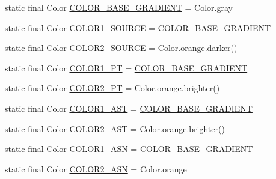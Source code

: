 \begin{DoxyCompactItemize}
\item 
static final Color \hyperlink{classit_1_1emarolab_1_1cagg_1_1debugging_1_1DebuggingDefaults_a17491ab8ed655381e8f8cc34e9d3b670}{C\-O\-L\-O\-R\-\_\-\-B\-A\-S\-E\-\_\-\-G\-R\-A\-D\-I\-E\-N\-T} = Color.\-gray
\item 
static final Color \hyperlink{classit_1_1emarolab_1_1cagg_1_1debugging_1_1DebuggingDefaults_a1ca8258073b237027e0c9b3499c239cf}{C\-O\-L\-O\-R1\-\_\-\-S\-O\-U\-R\-C\-E} = \hyperlink{classit_1_1emarolab_1_1cagg_1_1debugging_1_1DebuggingDefaults_a17491ab8ed655381e8f8cc34e9d3b670}{C\-O\-L\-O\-R\-\_\-\-B\-A\-S\-E\-\_\-\-G\-R\-A\-D\-I\-E\-N\-T}
\item 
static final Color \hyperlink{classit_1_1emarolab_1_1cagg_1_1debugging_1_1DebuggingDefaults_ad8a29b271e97836a8d707dd93f0fb553}{C\-O\-L\-O\-R2\-\_\-\-S\-O\-U\-R\-C\-E} = Color.\-orange.\-darker()
\item 
static final Color \hyperlink{classit_1_1emarolab_1_1cagg_1_1debugging_1_1DebuggingDefaults_adbfdef4e2fb7f930f8842592472ea99c}{C\-O\-L\-O\-R1\-\_\-\-P\-T} = \hyperlink{classit_1_1emarolab_1_1cagg_1_1debugging_1_1DebuggingDefaults_a17491ab8ed655381e8f8cc34e9d3b670}{C\-O\-L\-O\-R\-\_\-\-B\-A\-S\-E\-\_\-\-G\-R\-A\-D\-I\-E\-N\-T}
\item 
static final Color \hyperlink{classit_1_1emarolab_1_1cagg_1_1debugging_1_1DebuggingDefaults_a48fc98475576b4f27c6b95531d7a4367}{C\-O\-L\-O\-R2\-\_\-\-P\-T} = Color.\-orange.\-brighter()
\item 
static final Color \hyperlink{classit_1_1emarolab_1_1cagg_1_1debugging_1_1DebuggingDefaults_afdf65da53b98a99e5e2430d46f77d7a4}{C\-O\-L\-O\-R1\-\_\-\-A\-S\-T} = \hyperlink{classit_1_1emarolab_1_1cagg_1_1debugging_1_1DebuggingDefaults_a17491ab8ed655381e8f8cc34e9d3b670}{C\-O\-L\-O\-R\-\_\-\-B\-A\-S\-E\-\_\-\-G\-R\-A\-D\-I\-E\-N\-T}
\item 
static final Color \hyperlink{classit_1_1emarolab_1_1cagg_1_1debugging_1_1DebuggingDefaults_a1084bb5fb432224ea6ee2d5b2090ebc6}{C\-O\-L\-O\-R2\-\_\-\-A\-S\-T} = Color.\-orange.\-brighter()
\item 
static final Color \hyperlink{classit_1_1emarolab_1_1cagg_1_1debugging_1_1DebuggingDefaults_abb22e10517cc942779a8554557e00a05}{C\-O\-L\-O\-R1\-\_\-\-A\-S\-N} = \hyperlink{classit_1_1emarolab_1_1cagg_1_1debugging_1_1DebuggingDefaults_a17491ab8ed655381e8f8cc34e9d3b670}{C\-O\-L\-O\-R\-\_\-\-B\-A\-S\-E\-\_\-\-G\-R\-A\-D\-I\-E\-N\-T}
\item 
static final Color \hyperlink{classit_1_1emarolab_1_1cagg_1_1debugging_1_1DebuggingDefaults_a0b17fd18816e65e0ade6e5fe6f856421}{C\-O\-L\-O\-R2\-\_\-\-A\-S\-N} = Color.\-orange

\end{DoxyCompactItemize}
